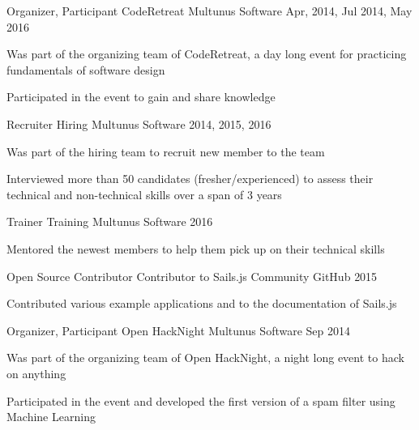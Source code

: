 \begin{cventries}
  \cventry
    {Organizer, Participant}
    {CodeRetreat}
    {Multunus Software}
    {Apr, 2014, Jul 2014, May 2016}
    {
      \begin{cvitems}
        \item {Was part of the organizing team of CodeRetreat, a day long event for practicing fundamentals of software design}
        \item {Participated in the event to gain and share knowledge}
      \end{cvitems}
    }
  \cventry
    {Recruiter}
    {Hiring}
    {Multunus Software}
    {2014, 2015, 2016}
    {
      \begin{cvitems}
        \item {Was part of the hiring team to recruit new member to the team}
        \item {Interviewed more than 50 candidates (fresher/experienced) to assess their technical and non-technical skills over a span of 3 years}
      \end{cvitems}
    }
  \cventry
    {Trainer}
    {Training}
    {Multunus Software}
    {2016}
    {
      \begin{cvitems}
        \item {Mentored the newest members to help them pick up on their technical skills}
      \end{cvitems}
    }
  \cventry
    {Open Source Contributor}
    {Contributor to Sails.js Community}
    {GitHub}
    {2015}
    {
      \begin{cvitems}
        \item {Contributed various example applications and to the documentation of Sails.js}
      \end{cvitems}
    }
  \cventry
    {Organizer, Participant}
    {Open HackNight}
    {Multunus Software}
    {Sep 2014}
    {
      \begin{cvitems}
        \item {Was part of the organizing team of Open HackNight, a night long event to hack on anything}
        \item {Participated in the event and developed the first version of a spam filter using Machine Learning}
      \end{cvitems}
    }
\end{cventries}
